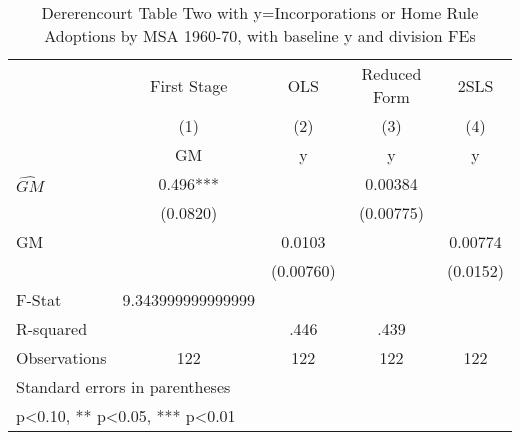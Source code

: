 \begin{table}[htbp]\centering
\def\sym#1{\ifmmode^{#1}\else\(^{#1}\)\fi}
\caption{Dererencourt Table Two with y=Incorporations or Home Rule Adoptions by MSA 1960-70, with baseline y and division FEs}
\begin{tabular}{l*{4}{c}}
\toprule
                    & First Stage   &         OLS   &Reduced Form   &        2SLS   \\
                    &\multicolumn{1}{c}{(1)}&\multicolumn{1}{c}{(2)}&\multicolumn{1}{c}{(3)}&\multicolumn{1}{c}{(4)}\\
                    &\multicolumn{1}{c}{GM}&\multicolumn{1}{c}{y}&\multicolumn{1}{c}{y}&\multicolumn{1}{c}{y}\\
\midrule
$\hat{GM}$          &       0.496***&               &     0.00384   &               \\
                    &    (0.0820)   &               &   (0.00775)   &               \\
\addlinespace
GM                  &               &      0.0103   &               &     0.00774   \\
                    &               &   (0.00760)   &               &    (0.0152)   \\
\midrule
F-Stat              &9.343999999999999   &               &               &               \\
R-squared           &               &        .446   &        .439   &               \\
Observations        &         122   &         122   &         122   &         122   \\
\bottomrule
\multicolumn{5}{l}{\footnotesize Standard errors in parentheses}\\
\multicolumn{5}{l}{\footnotesize * p<0.10, ** p<0.05, *** p<0.01}\\
\end{tabular}
\end{table}
